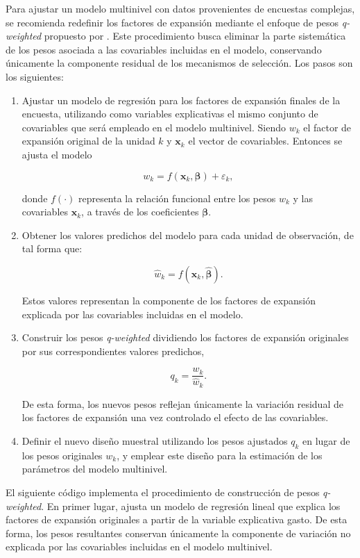 \documentclass[
  spanish,
  12pt,
]{book}
\begin{document}
Para ajustar un modelo multinivel con datos provenientes de encuestas complejas, se recomienda redefinir los factores de expansión mediante el enfoque de pesos \emph{q-weighted} propuesto por \citet{pfeffermann2011modelling}. Este procedimiento busca eliminar la parte sistemática de los pesos asociada a las covariables incluidas en el modelo, conservando únicamente la componente residual de los mecanismos de selección. Los pasos son los siguientes:

\begin{enumerate}
\def\labelenumi{\arabic{enumi}.}
\item
  Ajustar un modelo de regresión para los factores de expansión finales de la encuesta, utilizando como variables explicativas el mismo conjunto de covariables que será empleado en el modelo multinivel. Siendo \(w_k\) el factor de expansión original de la unidad \(k\) y \(\mathbf{x}_k\) el vector de covariables. Entonces se ajusta el modelo

  \[
  w_k = f(\mathbf{x}_k, \boldsymbol{\beta}) + \varepsilon_k,
  \]

  donde \(f(\cdot)\) representa la relación funcional entre los pesos \(w_k\) y las covariables \(\mathbf{x}_k\), a través de los coeficientes \(\boldsymbol{\beta}\).
\item
  Obtener los valores predichos del modelo para cada unidad de observación, de tal forma que:

  \[
  \hat{w}_k = f(\mathbf{x}_k, \hat{\boldsymbol{\beta}}).
  \]

  Estos valores representan la componente de los factores de expansión explicada por las covariables incluidas en el modelo.
\item
  Construir los pesos \emph{q-weighted} dividiendo los factores de expansión originales por sus correspondientes valores predichos,

  \[
  q_k = \frac{w_k}{\hat{w}_k}.
  \]

  De esta forma, los nuevos pesos reflejan únicamente la variación residual de los factores de expansión una vez controlado el efecto de las covariables.
\item
  Definir el nuevo diseño muestral utilizando los pesos ajustados \(q_k\) en lugar de los pesos originales \(w_k\), y emplear este diseño para la estimación de los parámetros del modelo multinivel.
\end{enumerate}

El siguiente código implementa el procedimiento de construcción de pesos \emph{q-weighted}. En primer lugar, ajusta un modelo de regresión lineal que explica los factores de expansión originales a partir de la variable explicativa gasto. De esta forma, los pesos resultantes conservan únicamente la componente de variación no explicada por las covariables incluidas en el modelo multinivel.
\end{document}
